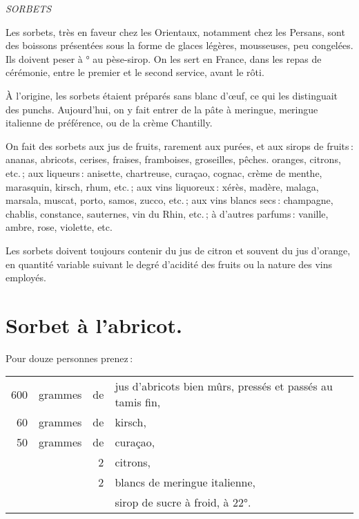 \sk

\bigskip
\bigskip

\begin{center}
\textit{SORBETS}
\end{center}

\bigskip

Les sorbets, très en faveur chez les Orientaux, notamment chez les Persans,
sont des boissons présentées sous la forme de glaces légères, mousseuses, peu
congelées. Ils doivent peser {\mmm} à {\mmm}° au pèse-sirop. On les
sert en France, dans les repas de cérémonie, entre le premier et le second
service, avant le rôti.

À l'origine, les sorbets étaient préparés sans blanc d'œuf, ce qui les
distinguait des punchs. Aujourd'hui, on y fait entrer de la pâte à meringue,
meringue italienne de préférence, ou de la crème Chantilly.

On fait des sorbets aux jus de fruits, rarement aux purées, et aux sirops de
fruits : ananas, abricots, cerises, fraises, framboises, groseilles, pêches.
oranges, citrons, etc. ; aux liqueurs : anisette, chartreuse, curaçao, cognac,
crème de menthe, marasquin, kirsch, rhum, etc. ; aux vins liquoreux : xérès,
madère, malaga, marsala, muscat, porto, samos, zucco, etc. ; aux vins blancs
secs : champagne, chablis, constance, sauternes, vin du Rhin, etc. ; à d'autres
parfums : vanille, ambre, rose, violette, etc.

Les sorbets doivent toujours contenir du jus de citron et souvent du jus d'orange,
en quantité variable suivant le degré d'acidité des fruits ou la nature des vins
employés.

\section*{\centering Sorbet à l’abricot.}
{}

Pour douze personnes prenez :

\footnotesize
\begin{longtable}{rrrp{16em}}
    600 & grammes & de & jus d'abricots bien mûrs, pressés et passés au tamis fin,                        \\
     60 & grammes & de & kirsch,                                                                          \\
     50 & grammes & de & curaçao,                                                                         \\
        &         &  2 & citrons,                                                                         \\
        &         &  2 & blancs de meringue italienne,                                                    \\
        &         &    & sirop de sucre à froid, à 22°.                                                   \\
\end{longtable}
\normalsize


